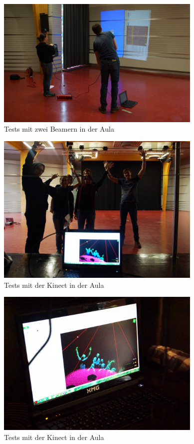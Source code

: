 \begin{figure}[htbp]
	\centering
		\includegraphics[width=0.88\textwidth]{images/Test1.png}
	\caption{Tests mit zwei Beamern in der Aula}
	\label{fig:Test1}
\end{figure}

\begin{figure}[htbp]
	\centering
		\includegraphics[width=0.88\textwidth]{images/Test2.png}
	\caption{Tests mit der Kinect in der Aula}
	\label{fig:Test2}
\end{figure}

\begin{figure}[htbp]
	\centering
		\includegraphics[width=0.88\textwidth]{images/Test3.png}
	\caption{Tests mit der Kinect in der Aula}
	\label{fig:Test3}
\end{figure}


